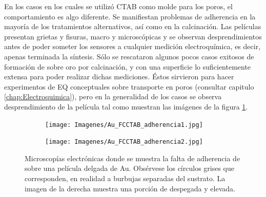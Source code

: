 			En los casos en los cuales se utilizó CTAB como molde para los poros, el comportamiento es algo diferente. Se manifiestan problemas de adherencia en la mayoría de los tratamientos alternativos, así como en la calcinación. Las películas presentan grietas y fisuras, macro y microscópicas y se observan desprendimientos antes de poder someter los sensores a cualquier medición electroquímica, es decir, apenas terminada la síntesis. Sólo se rescataron algunos pocos casos exitosos de formación de \pdmC\space sobre oro por calcinación, y con una superficie lo suficientemente extensa para poder realizar dichas mediciones. Éstos sirvieron para hacer experimentos de EQ conceptuales sobre transporte en poros (consultar capitulo \ref{chap:Electroquimica}), pero en la generalidad de los casos se observa desprendimiento de la película tal como muestran las imágenes de la figura \ref{fig:CTAB_adherencia}.

	     
				\begin{figure}[bh!]
		 	   	    \begin{subfigure}[t]{0.49\textwidth}
			        	\texttt{[image: Imagenes/Au\_FCCTAB\_adherencia1.jpg]}
			       		\end{subfigure}
					\begin{subfigure}[t]{0.49\textwidth}
			 	   	    \texttt{[image: Imagenes/Au\_FCCTAB\_adherencia2.jpg]}
			       		\end{subfigure}
					 \caption[Adherencia de CTAB sobre electrodos.]{Microscopías electrónicas donde se muestra la falta de adherencia de \pdmC\space sobre una película delgada de Au. Obsérvese los círculos grises que corresponden, en realidad a burbujas separadas del sustrato. La imagen de la derecha muestra una porción de \pdmC\space despegada y elevada.}
					 \label{fig:CTAB_adherencia}	
				     \end{figure}
			
